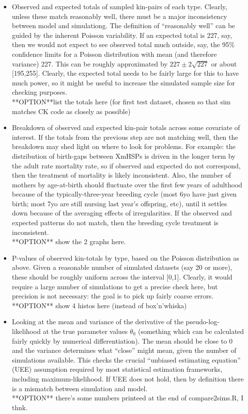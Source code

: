\begin{itemize}
\item Observed and expected totals of sampled kin-pairs of each type. Clearly,
unless these match reasonably well, there must be a major inconsistency
between model and simulationg. The definition of ``reasonably well''
can be guided by the inherent Poisson variability. If an expected
total is 227, say, then we would not expect to see observed total
much outside, say, the 95\% confidence limits for a Poisson distribution
with mean (and therefore variance) 227. This can be roughly approximated
by $227\pm2\sqrt{227}$ or about {[}195,255{]}. Clearly, the expected
total needs to be fairly large for this to have much power, so it
might be useful to increase the simulated sample size for checking
purposes.\\
{*}{*}OPTION{*}{*}list the totals here (for first test dataset, chosen
so that sim matches CK code as closely as possible)
\item Breakdown of observed and expected kin-pair totals across some covariate
of interest. If the totals from the previous step are not matching
well, then the breakdown may shed light on where to look for problems.
For example: the distribution of birth-gaps between XmHSPs is driven
in the longer term by the adult rate mortality rate, so if observed
and expected do not correspond, then the treatment of mortality is
likely inconsistent. Also, the number of mothers by age-at-birth should
fluctuate over the first few years of adulthood because of the typically-three-year
breeding cycle (most 6yo have just given birth; most 7yo are still
nursing last year's offspring, etc), until it settles down because
of the averaging effects of irregularities. If the observed and expected
patterns do not match, then the breeding cycle treatment is inconsistent.\\
{*}{*}OPTION{*}{*} show the 2 graphs here.
\item P-values of observed kin-totals by type, based on the Poisson distribution
as above. Given a reasonable number of simulated datasets (say 20
or more), these should be roughly uniform across the interval {[}0,1{]}.
Clearly, it would require a large number of simulations to get a precise
check here, but precision is not necessary: the goal is to pick up
fairly coarse errors.\\
{*}{*}OPTION{*}{*} show 4 histos here (instead of box'n'whiska)
\item Looking at the mean and variance of the derivative of the pseudo-log-likelihood
at the true parameter values $\theta_{0}$ (something which can be
calculated fairly quickly by numerical differentiation). The mean
should be close to 0 and the variance determines what ``close''
might mean, given the number of simulations available. This checks
the crucial ``unbiased estimating equation'' (UEE) assumption required
by most statistical estimation frameworks, including maximum-likelihood.
If UEE does not hold, then by definition there is a mismatch between
simulation and model.\\
{*}{*}OPTION{*}{*} there's some numbers printeed at the end of compare2sims.R,
I thnk.
\end{itemize}
